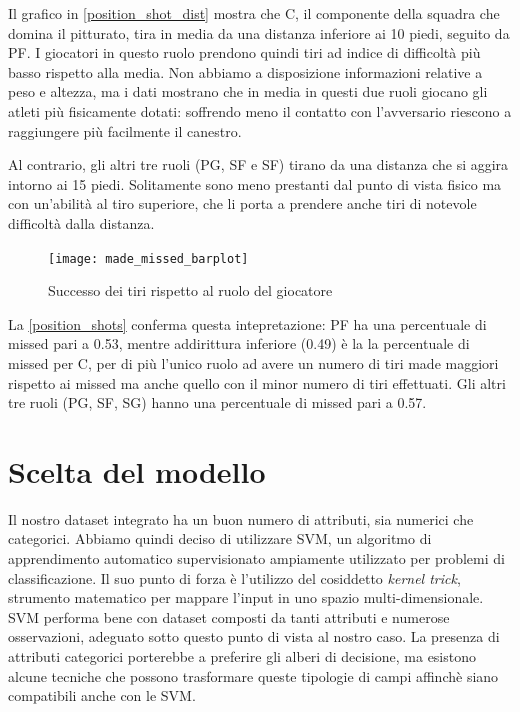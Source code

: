 Il grafico in \autoref{position_shot_dist} mostra che C, il componente della squadra che domina il pitturato, tira in media da una distanza inferiore ai 10 piedi, seguito da PF. I giocatori in questo ruolo prendono quindi tiri ad indice di difficoltà più basso rispetto alla media.
Non abbiamo a disposizione informazioni relative a peso e altezza, ma i dati \cite{basketball-reference} mostrano che in media in questi due ruoli giocano gli atleti più fisicamente dotati: soffrendo meno il contatto con l'avversario riescono a raggiungere più facilmente il canestro.

Al contrario, gli altri tre ruoli (PG, SF e SF) tirano da una distanza che si aggira intorno ai 15 piedi. Solitamente sono meno prestanti dal punto di vista fisico ma con un'abilità al tiro superiore, che li porta a prendere anche tiri di notevole difficoltà dalla distanza.

\begin{figure}[H]
\caption{Successo dei tiri rispetto al ruolo del giocatore}
\label{position_shots}
\texttt{[image: made\_missed\_barplot]}
\end{figure}

La \autoref{position_shots} conferma questa intepretazione: PF ha una percentuale di missed pari a 0.53, mentre addirittura inferiore (0.49) è la la percentuale di missed per C, per di più l'unico ruolo ad avere un numero di tiri made maggiori rispetto ai missed ma anche quello con il minor numero di tiri effettuati.
Gli altri tre ruoli (PG, SF, SG) hanno una percentuale di missed pari a 0.57.

\pagebreak

\section{Scelta del modello}

Il nostro dataset integrato ha un buon numero di attributi, sia numerici che categorici.
Abbiamo quindi deciso di utilizzare SVM, un algoritmo di apprendimento automatico supervisionato ampiamente utilizzato per problemi di classificazione. Il suo punto di forza è l'utilizzo del cosiddetto \textit{kernel trick}, strumento matematico per mappare l'input in uno spazio multi-dimensionale. SVM performa bene con dataset composti da tanti attributi e numerose osservazioni, adeguato sotto questo punto di vista al nostro caso.
La presenza di attributi categorici porterebbe a preferire gli alberi di decisione, ma esistono alcune tecniche che possono trasformare queste tipologie di campi affinchè siano compatibili anche con le SVM.

